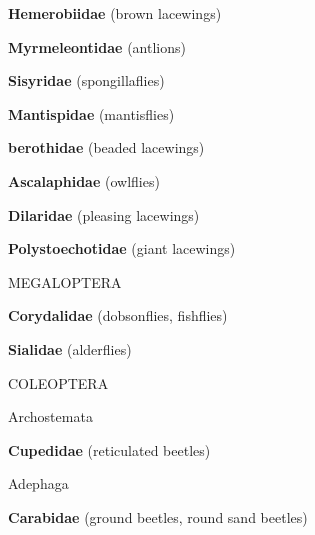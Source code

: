 \documentclass[letterpaper,10pt]{article}
\begin{document}
{\makebox[0.6cm]{}  \textbf{Hemerobiidae} (brown lacewings) \par
\makebox[0.6cm]{}  \textbf{Myrmeleontidae} (antlions) \par
\makebox[0.6cm]{}  \textbf{Sisyridae} (spongillaflies) \par
\makebox[0.6cm]{}  \textbf{Mantispidae} (mantisflies) \par
\makebox[0.6cm]{}  \textbf{berothidae} (beaded lacewings) \par
\makebox[0.6cm]{}  \textbf{Ascalaphidae} (owlflies) \par
\makebox[0.6cm]{}  \textbf{Dilaridae} (pleasing lacewings) \par
\makebox[0.6cm]{}  \textbf{Polystoechotidae} (giant lacewings) \par
%
%
%
\makebox[0.0cm]{}  MEGALOPTERA \par
\makebox[0.6cm]{}  \textbf{Corydalidae} (dobsonflies, fishflies) \par
\makebox[0.6cm]{}  \textbf{Sialidae} (alderflies) \par
%
%
%
\makebox[0.0cm]{}  COLEOPTERA \par
\makebox[0.20cm]{}  Archostemata \par
\makebox[0.6cm]{}  \textbf{Cupedidae} (reticulated beetles) \par
\makebox[0.20cm]{}  Adephaga \par
\makebox[0.6cm]{}  \textbf{Carabidae} (ground beetles, round sand beetles) \par
}
\end{document}
